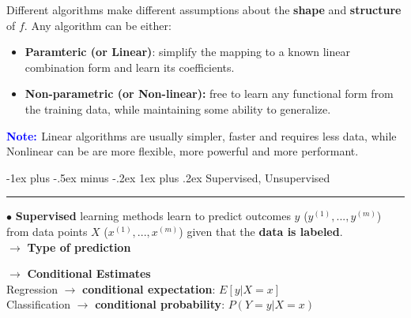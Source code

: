 \documentclass[letterpaper, 10.5pt,landscape]{article}
\makeatletter
\renewcommand{\subsubsection}{\@startsection{subsubsection}{3}{0mm}%
                                {-1ex plus -.5ex minus -.2ex}%
                                {1ex plus .2ex}%
                                {\normalfont\small\bfseries}}
\makeatother
\begin{document}
\begin{multicols*}{3}
Different algorithms make different assumptions about the
\textbf{shape} and \textbf{structure} of $f$. Any algorithm can be either:
\begin{itemize}
    \item \textbf{Paramteric (or Linear)}: simplify the mapping to a known linear combination form and learn its coefficients.
    \item \textbf{Non-parametric (or Non-linear):} free to learn any functional form from the training data, while maintaining some ability to generalize.
\end{itemize}

\textbf{\textcolor{blue}{Note: }} Linear algorithms are usually simpler, faster and requires
less data, while Nonlinear can be are more flexible, more powerful and more performant.

\subsubsection{Supervised, Unsupervised} {\color{teal}\hrule height 0.5pt} \smallskip

$\bullet$ \textbf{Supervised} learning methods learn to predict outcomes $y$ (\(y^{(1)}, ..., y^{(m)}\)) from data points $X$ (\(x^{(1)}, ..., x^{(m)}\)) given that the \textbf{data is labeled}. \\

$\rightarrow$ \textbf{Type of prediction}
\vspace{-5pt}
\begin{center}
        \footnotesize
\end{center}

\vspace{-3pt}
$\rightarrow$ \textbf{Conditional Estimates} \\
Regression $\rightarrow$ \textbf{conditional expectation}: \(E \left[y|X=x \right] \) \\
Classification $\rightarrow$ \textbf{conditional probability}: \(P(Y=y | X=x) \)


\end{multicols*}
\end{document}

